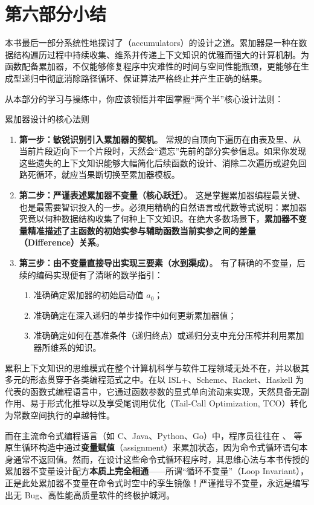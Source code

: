 
\chapter{第六部分小结}
\label{sec:ch34_summary}

本书最后一部分系统性地探讨了（accumulators）的设计之道。累加器是一种在数据结构遍历过程中持续收集、维系并传递上下文知识的优雅而强大的计算机制。为函数配备累加器，不仅能够修复程序中灾难性的时间与空间性能瓶颈，更能够在生成型递归中彻底消除路径循环、保证算法严格终止并产生正确的结果。

从本部分的学习与操练中，你应该领悟并牢固掌握“两个半”核心设计法则：

\begin{recipebox}{累加器设计的核心法则}
\begin{enumerate}
  \item \textbf{第一步：敏锐识别引入累加器的契机}。
  常规的自顶向下遍历在由表及里、从当前片段迈向下一个片段时，天然会“遗忘”先前的部分实参信息。如果你发现这些遗失的上下文知识能够大幅简化后续函数的设计、消除二次遍历或避免回路死循环，就应当果断切换至累加器模板。

  \item \textbf{第二步：严谨表述累加器不变量（核心跃迁）}。
  这是掌握累加器编程最关键、也是最需要智识投入的一步。必须用精确的自然语言或代数等式说明：累加器究竟以何种数据结构收集了何种上下文知识。在绝大多数场景下，\textbf{累加器不变量精准描述了主函数的初始实参与辅助函数当前实参之间的差量（Difference）关系}。

  \item \textbf{第三步：由不变量直接导出实现三要素（水到渠成）}。
  有了精确的不变量，后续的编码实现便有了清晰的数学指引：
  \begin{enumerate}
    \item 准确确定累加器的初始启动值 $a_0$；
    \item 准确确定在深入递归的单步操作中如何更新累加器值；
    \item 准确确定如何在基准条件（递归终点）或递归分支中充分压榨并利用累加器所维系的知识。
  \end{enumerate}
\end{enumerate}
\end{recipebox}

累积上下文知识的思维模式在整个计算机科学与软件工程领域无处不在，并以极其多元的形态贯穿于各类编程范式之中。在以 ISL+、Scheme、Racket、Haskell 为代表的函数式编程语言中，它通过函数参数的显式单向流动来实现，天然具备无副作用、易于形式化推导以及享受尾调用优化（Tail-Call Optimization, TCO）转化为常数空间执行的卓越特性。

而在主流命令式编程语言（如 C、Java、Python、Go）中，程序员往往在 、 等原生循环构造中通过\textbf{变量赋值}（assignment）来累加状态，因为命令式循环语句本身通常不返回值。然而，在设计这些命令式循环程序时，其思维心法与本书传授的累加器不变量设计配方\textbf{本质上完全相通}——所谓“循环不变量”（Loop Invariant），正是此处累加器不变量在命令式时空中的孪生镜像！严谨推导不变量，永远是编写出无 Bug、高性能高质量软件的终极护城河。
